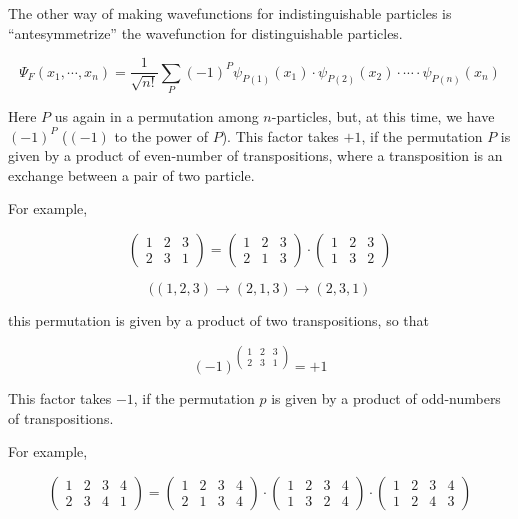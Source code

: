 ﻿\documentclass[twoside]{book}
\numberwithin{equation}{section}
\begin{document}
The other way of making wavefunctions for indistinguishable particles is ``antesymmetrize'' the wavefunction for distinguishable particles. %

\[\Psi_F(x_1,\cdots,x_n) = \frac{1}{\sqrt{n!}}\sum_P(-1)^P\psi_{P(1)}(x_1)\cdot\psi_{P(2)}(x_2)\cdot\cdots\cdot\psi_{P(n)}(x_n) \]

Here $P$ us again in a permutation among $n$-particles, but, at this time, we have $(-1)^P$ ($(-1)$ to the power of $P$). This factor takes $+1$, if the permutation $P$ is given by a product of even-number of transpositions, where a transposition is an exchange between a pair of two particle. 

For example, 

\[
\left(\begin{matrix}
1 & 2 & 3\\ 2 & 3 & 1
\end{matrix}\right) = 
\left(\begin{matrix}
1 & 2 & 3\\ 2 & 1 & 3
\end{matrix}\right)
\cdot
\left(\begin{matrix}
1 & 2 & 3\\ 1 & 3 & 2
\end{matrix}\right)
\]

\[((1,2,3)\rightarrow(2,1,3)\rightarrow(2,3,1) \]

this permutation is given by a product of two transpositions, so that

\[(-1)^{\left(\begin{matrix}
1 & 2 & 3\\ 2 & 3 & 1
\end{matrix}\right)} = +1 \]

This factor takes $-1$, if the permutation $p$ is given by a product of odd-numbers of transpositions. 

For example, 

\[
\left(\begin{matrix}
1 & 2 & 3 & 4\\ 2 & 3 & 4 & 1
\end{matrix}\right)=
\left(\begin{matrix}
1 & 2 & 3 & 4\\ 2 & 1 & 3 & 4
\end{matrix}\right)
\cdot
\left(\begin{matrix}
1 & 2 & 3 & 4\\ 1 & 3 & 2 & 4
\end{matrix}\right)
\cdot
\left(\begin{matrix}
1 & 2 & 3 & 4\\ 1 & 2 & 4 & 3
\end{matrix}\right)
\]
\end{document}
